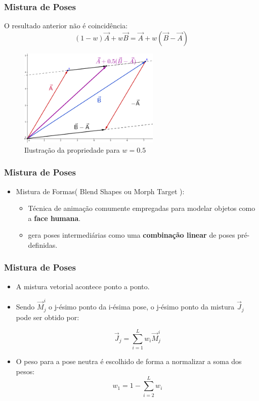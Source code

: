 \documentclass[brazil]{beamer}
\begin{document}
\begin{frame}
\frametitle{Mistura de Poses}

        O resultado anterior não é coincidência: 
          $$ (1 - w)\vec{A} + w \vec{B} = \vec{A} + w (\vec{B} -
          \vec{A})$$

	\begin{figure}
        \centering
        \includegraphics[width = 0.6\textwidth, keepaspectratio]{./img/vectors01.png}
        \caption{Ilustração da propriedade para $w = 0.5$}
      \end{figure}
\end{frame}
 
\begin{frame}
\frametitle{Mistura de Poses}
  \begin{itemize}
  	\item Mistura de Formas( Blend Shapes ou Morph Target ):
 	 	\begin{itemize}
        \item Técnica de animação comumente empregadas para modelar objetos como a \textbf{face humana}.
        \item gera poses intermediárias como uma \textbf{combinação linear} de poses pré-definidas. 
  \end{itemize} 

  \end{itemize} 
\end{frame}

\begin{frame}
\frametitle{Mistura de Poses}
 	 	\begin{itemize}
  	    \item A mistura vetorial acontece ponto a ponto.
          
        \item Sendo $\vec{M}_j^i$ o j-ésimo ponto da i-ésima pose, o j-ésimo
          ponto da mistura $\vec{J}_j$ pode ser obtido por:

      
          \begin{equation}
            \vec{J}_j = \sum_{i=1}^L  w_i \vec{M}_j^i
          \end{equation}

          \item O peso para a pose neutra é escolhido de forma a normalizar a
            soma dos pesos:
            \begin{equation}
              w_1 = 1 - \sum_{i=2}^L w_i
            \end{equation}
          
    \end{itemize} 
\end{frame}
\end{document}
